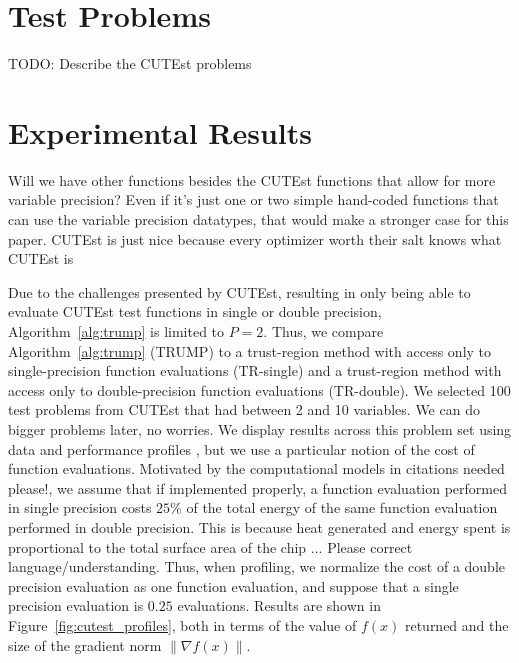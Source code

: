 \documentclass{article}
\newcommand{\algref}[1]{{\rm Algorithm~\ref{alg:#1}}}
\newcommand{\figref}[1]{{\rm Figure~\ref{fig:#1}}}
\newcommand{\mmnote}[1]{\textsf{{\color{red}{ MM:}   #1}}}
\newcommand{\jhnote}[1]{\textsf{{\color{blue}{ JH:}   #1}}}
\begin{document}
\section{Test Problems}
\label{sec:testcase}

\jhnote{TODO: Describe the CUTEst problems}

\section{Experimental Results}
\label{sec:results}
\mmnote{Will we have other functions besides the CUTEst functions that allow for more variable precision? Even if it's just one or two simple hand-coded functions that can use the variable precision datatypes, that would make a stronger case for this paper. CUTEst is just nice because every optimizer worth their salt knows what CUTEst is} 

Due to the challenges presented by CUTEst, resulting in only being able to evaluate CUTEst test functions in single or double precision, \algref{trump} is limited to $P=2$. Thus, we compare \algref{trump} (TRUMP) to a trust-region method with access only to single-precision function evaluations (TR-single) and a trust-region method with access only to double-precision function evaluations (TR-double). 
We selected 100 test problems from CUTEst that had between 2 and 10 variables. \mmnote{We can do bigger problems later, no worries.}
We display results across this problem set using data and performance profiles \cite{EDD01, JJMSMW09}, but we use a particular notion of the cost of function evaluations. Motivated by the computational models in \mmnote{citations needed please!}, we assume that if implemented properly, a function evaluation performed in single precision costs $25\%$ of the total energy of the same function evaluation performed in double precision. This is because heat generated and energy spent is proportional to the total surface area of the chip ... \mmnote{Please correct language/understanding.} Thus, when profiling, we normalize the cost of a double precision evaluation as one function evaluation, and suppose that a single precision evaluation is $0.25$ evaluations. Results are shown in \figref{cutest_profiles}, both in terms of the value of $f(x)$ returned and the size of the gradient norm $\|\nabla f(x)\|$. 
\end{document}
